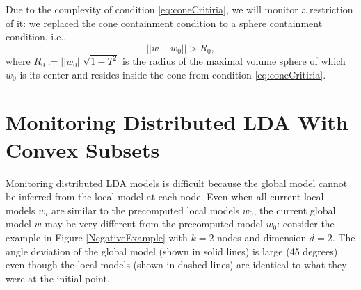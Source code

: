 \documentclass{vldb}
\begin{document}
Due to the complexity of condition \ref{eq:coneCritiria}, we will monitor a restriction of it: we replaced the cone containment condition to a  sphere containment condition, i.e., 
\begin{equation} \label{eq:critiria}
||w-w_0||   >  R_0,
\end{equation}
where $R_0 := ||w_0|| \sqrt{1-T^2}$ is the radius of the maximal volume sphere of which $w_0$ is its center and resides inside the cone from condition \ref{eq:coneCritiria}.


\section{Monitoring Distributed LDA With Convex Subsets}
Monitoring distributed LDA models is difficult because the global model cannot be inferred from the local model at each node. Even when all current local models $w_i$ are similar to the precomputed local models $w_0$, the current global model $w$ may be very different from the precomputed model $w_0$: consider the example in Figure \ref{NegativeExample} with $k = 2$ nodes and dimension $d =2$. The angle deviation of the global model (shown in solid lines) is large (45 degrees) even though the local models (shown in dashed lines) are identical to what they were at the initial point.
\end{document}
